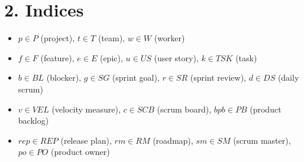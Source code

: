 \documentclass[11pt,a4paper]{article}
\begin{document}
\section{2. Indices}
\begin{itemize}[leftmargin=2em]
  \item $p\in P$ (project), $t\in T$ (team), $w\in W$ (worker)
  \item $f\in F$ (feature), $e\in E$ (epic), $u\in US$ (user story), $k\in TSK$ (task)
  \item $b\in BL$ (blocker), $g\in SG$ (sprint goal), $r\in SR$ (sprint review), $d\in DS$ (daily scrum)
  \item $v\in VEL$ (velocity measure), $c\in SCB$ (scrum board), $bpb\in PB$ (product backlog)
  \item $rep\in REP$ (release plan), $rm\in RM$ (roadmap), $sm\in SM$ (scrum master), $po\in PO$ (product owner)
\end{itemize}

\end{document}
